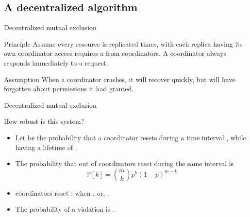 \subsection{A decentralized algorithm}
\begin{slide}{Decentralized mutual exclusion}
  \begin{block}{Principle}
    Assume every resource is replicated  times, with each replica having its own coordinator
    \mathexpr{\Rightarrow} access requires a  from  coordinators. A
    coordinator always responds immediately to a request.
  \end{block}
  \begin{block}{Assumption} 
    When a coordinator crashes, it will recover quickly, but will have forgotten about permissions it had
    granted.
  \end{block}
\end{slide}
\begin{slide}{Decentralized mutual exclusion}
  \begin{block}{How robust is this system?}
    \begin{itemize}
    \item<1-> Let  be the probability that a coordinator resets during a time interval
      , while having a lifetime of .
    \item<2-> The probability  that
     out of  coordinators reset during the same interval is
    \[
    \mathbb{P}[k] = \binom{m}{k} p^k (1 - p)^{m-k}
    \]
    \item<3->  coordinators reset \mathexpr{\Rightarrow} : when , or, .
    \item<4-> The probability of a violation is .
    \end{itemize}
  \end{block}
\end{slide}
